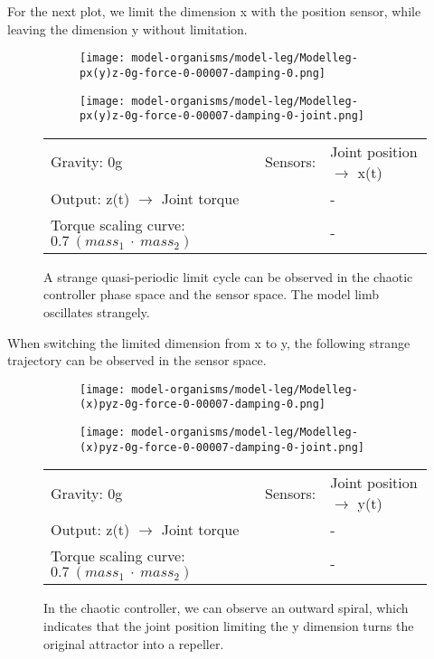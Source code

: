 \documentclass[main]{subfiles}
\begin{document}
For the next plot, we limit the dimension x with the position sensor, while leaving the dimension y without limitation.

\begin{figure}[H]
	\centering
		\begin{subfigure}[c]{0.45\textwidth}
	\texttt{[image: model-organisms/model-leg/Modelleg-px(y)z-0g-force-0-00007-damping-0.png]}
		\end{subfigure}
	\begin{subfigure}[c]{0.45\textwidth}
	\texttt{[image: model-organisms/model-leg/Modelleg-px(y)z-0g-force-0-00007-damping-0-joint.png]}
		\end{subfigure}
	\caption[Joint position \(\rightarrow\) x(t) limited chaotic controller controlling model leg.]{A strange quasi-periodic limit cycle can be observed in the chaotic controller phase space and the sensor space. The model limb oscillates strangely.}
	\begin{tabular}{l|ll}
	\hline 
	Gravity: 0g  & Sensors: & Joint position \(\rightarrow\) x(t)\\
	 Output: z(t) \(\rightarrow\) Joint torque & & - \\
	  Torque scaling curve: \(0.7~(mass_1~\cdot~mass_2)\) & & - \\
	  \hline
	\end{tabular}
	\label{figure:limited-model-leg1}
\end{figure}

When switching the limited dimension from x to y, the following strange trajectory can be observed in the sensor space.

\begin{figure}[H]
	\centering
		\begin{subfigure}[c]{0.45\textwidth}
	\texttt{[image: model-organisms/model-leg/Modelleg-(x)pyz-0g-force-0-00007-damping-0.png]}
		\end{subfigure}
	\begin{subfigure}[c]{0.45\textwidth}
	\texttt{[image: model-organisms/model-leg/Modelleg-(x)pyz-0g-force-0-00007-damping-0-joint.png]}
		\end{subfigure}
	\caption[Joint position \(\rightarrow\) y(t) limited chaotic controller controlling model leg]{In the chaotic controller, we can observe an outward spiral, which indicates that the joint position limiting the y dimension turns the original attractor into a repeller.}
	\begin{tabular}{l|ll}
	\hline 
	Gravity: 0g  & Sensors: & Joint position \(\rightarrow\) y(t)\\
	 Output: z(t) \(\rightarrow\) Joint torque & & - \\
	  Torque scaling curve: \(0.7~(mass_1~\cdot~mass_2)\) & & - \\
	  \hline
	\end{tabular}

	\label{figure:limited-model-leg2}
\end{figure}
\end{document}
